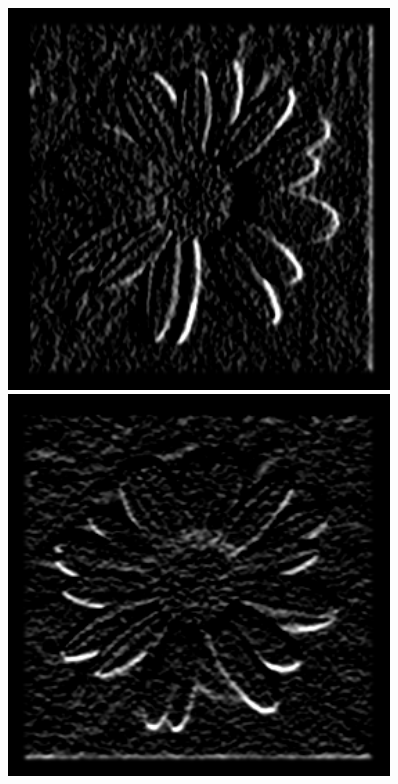 \documentclass[a4paper]{report}
\begin{document}
\begin{figure}[H]
\centering
\begin{minipage}{.5\textwidth}
  \centering
    \includegraphics[width=0.9\textwidth]{images/Canny/flowerIx.png}
\end{minipage}%
\begin{minipage}{.5\textwidth}
  \centering
  \includegraphics[width=0.9\textwidth]{images/Canny/flowerIy.png}
\end{minipage}
\end{figure}
\end{document}
